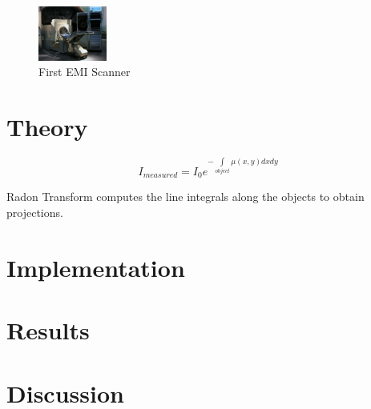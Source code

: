 \documentclass[journal]{IEEEtran}
\begin{document}
\begin{figure}[h]
\centering
\includegraphics[width=0.2\textwidth]{images/CT.jpg}
\centering \caption{First EMI Scanner \cite{emict}}\label{fig:CT1010}
\end{figure}

\vfill{\null}

\section{Theory} \label{sec:theory}

\begin{equation}
	I_{measured} = I_0 e^{-\int\limits_{object}\mu(x,y)dxdy}
\end{equation}

Radon Transform computes the line integrals along the objects to obtain projections. 

\section{Implementation} \label{sec:implementation}

\section{Results} \label{sec:results}

\section{Discussion} \label{sec:discuss}

\printbibliography
\end{document}
